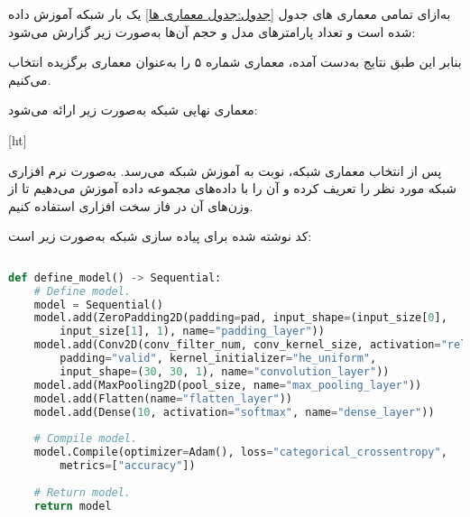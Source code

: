 به‌ازای تمامی معماری های جدول \ref{جدول:جدول معماری ها} یک بار شبکه آموزش داده شده است و تعداد پارامتر‌های مدل و حجم آن‌ها به‌صورت زیر گزارش می‌شود:\\

\begin{table}[ht]
	\centering
	\caption{اطلاعات مربوط به معماری‌های مختلف}
\end{table}


بنابر این طبق نتایج به‌دست آمده، معماری شماره ۵ را به‌عنوان معماری برگزیده انتخاب می‌کنیم.

معماری نهایی شبکه به‌صورت زیر ارائه می‌شود:\newpage

[ht]


پس از انتخاب معماری شبکه، نوبت به آموزش شبکه می‌رسد. به‌صورت نرم افزاری شبکه مورد نظر را تعریف کرده و آن را با داده‌های مجموعه داده  آموزش می‌دهیم تا از وزن‌های آن در فاز سخت افزاری استفاده کنیم.


کد نوشته شده برای پیاده سازی شبکه به‌صورت زیر است: \newpage


\begin{latin}
\begin{lstlisting}[language=Python,caption={Model Definition}]
	
def define_model() -> Sequential:
	# Define model.
	model = Sequential()
	model.add(ZeroPadding2D(padding=pad, input_shape=(input_size[0],
		input_size[1], 1), name="padding_layer"))
	model.add(Conv2D(conv_filter_num, conv_kernel_size, activation="relu",
		padding="valid", kernel_initializer="he_uniform",
		input_shape=(30, 30, 1), name="convolution_layer"))
	model.add(MaxPooling2D(pool_size, name="max_pooling_layer"))
	model.add(Flatten(name="flatten_layer"))
	model.add(Dense(10, activation="softmax", name="dense_layer"))
	
	# Compile model.
	model.Compile(optimizer=Adam(), loss="categorical_crossentropy",
		metrics=["accuracy"])
		
	# Return model.
	return model
	
\end{lstlisting}
\end{latin}



